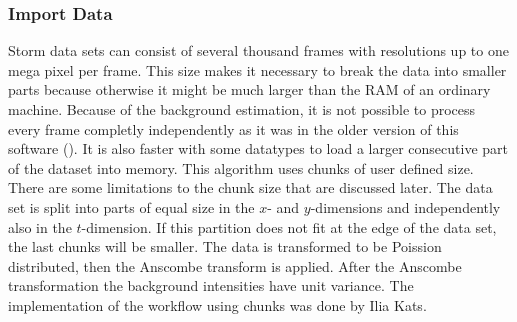 \subsubsection{Import Data}
Storm data sets can consist of several thousand frames with resolutions up to one mega pixel per frame. This size makes it necessary to break the data into smaller parts because otherwise it might be much larger than the RAM of an ordinary machine. Because of the background estimation, it is not possible to process every frame completly independently as it was in the older version of this software (\cite{MAJoachim}). It is also faster with some datatypes to load a larger consecutive part of the dataset into memory.\newline
This algorithm uses chunks of user defined size. There are some limitations to the chunk size that are discussed later. The data set is split into parts of equal size in the $x$- and $y$-dimensions and independently also in the $t$-dimension. If this partition does not fit at the edge of the data set, the last chunks will be smaller.\newline
The data is transformed to be Poission distributed, then the Anscombe transform is applied. After the Anscombe transformation the background intensities have unit variance.\newline
The implementation of the workflow using chunks was done by Ilia Kats.
